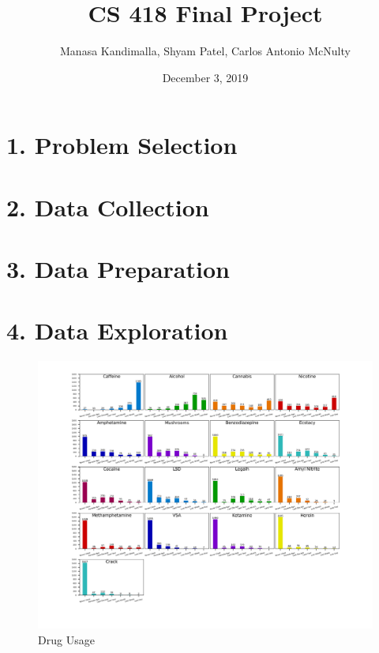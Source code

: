 \documentclass[10pt]{article}
\title{CS 418 Final Project}
\date{December 3, 2019}
\author {Manasa Kandimalla, Shyam Patel, Carlos Antonio McNulty}
\begin{document}
\maketitle

\section*{1. Problem Selection}

\section*{2. Data Collection}

\section*{3. Data Preparation}

\section*{4. Data Exploration}

\begin{figure}[H]
\caption{Drug Usage}
\centering
\includegraphics[scale=0.7]{drugs.png}
\end{figure}
\end{document}
